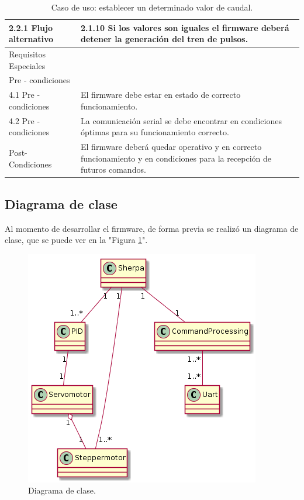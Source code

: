 \begin{table}[t]
\begin{center}
\begin{tabular}{ | m{4cm} | m{9cm} | }
2.2.1 Flujo alternativo & 
2.1.10 Si los valores son iguales el firmware deberá detener la generación del tren de pulsos. \\ \hline
Requisitos Especiales & \\ \hline


Pre - condiciones & \\ \hline
 
4.1 Pre - condiciones &
El firmware debe estar en estado de correcto funcionamiento. \\ \hline
4.2 Pre - condiciones &
La comunicación serial se debe encontrar en condiciones óptimas para su funcionamiento correcto. \\ \hline
Post- Condiciones &
El firmware deberá quedar operativo y en correcto funcionamiento y en condiciones para la recepción de futuros comandos.\\ \hline
\end{tabular}
\caption{ Caso de uso: establecer un determinado valor de caudal.}
\label{tab:establecer un determinado valor de caudal.}
\end{center}
\end{table}

\subsection{Diagrama de clase}
\label{subsec:Diagrama de clase}
Al momento de desarrollar el firmware, de forma previa se realizó un diagrama de clase, que se puede ver en la "Figura \ref{fig:Diagrama de clase.}". 
\begin{figure}
	\centering
	\includegraphics[scale=.75]{./Figures/DiagramaDeClase-DistribucionDeAgua.png}
	\caption{Diagrama de clase.}
	\label{fig:Diagrama de clase.}
	\end{figure}

